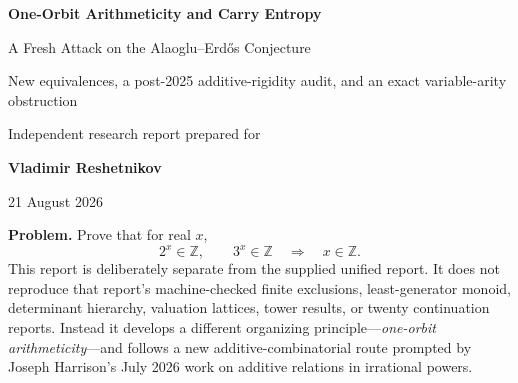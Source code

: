 \documentclass[11pt,oneside]{article}
\theoremstyle{definition}
\newcommand{\Z}{\mathbb{Z}}
\begin{document}
\hypersetup{pageanchor=false}
\begin{titlepage}
\centering
\vspace*{1.4cm}
{\Huge\bfseries\color{DeepBlue} One-Orbit Arithmeticity and Carry Entropy\par}
\vspace{0.35cm}
{\LARGE A Fresh Attack on the Alaoglu--Erd\H{o}s Conjecture\par}
\vspace{0.8cm}
{\large New equivalences, a post-2025 additive-rigidity audit, and an exact variable-arity obstruction\par}
\vfill
{\large Independent research report prepared for\par}
\vspace{0.15cm}
{\Large\bfseries Vladimir Reshetnikov\par}
\vspace{0.8cm}
{\large 21 August 2026\par}
\vfill
\begin{minipage}{0.88\textwidth}
\small
\textbf{Problem.} Prove that for real $x$,
\[
        2^x\in\Z,\qquad 3^x\in\Z
        \quad\Longrightarrow\quad x\in\Z.
\]
This report is deliberately separate from the supplied unified report.  It does not reproduce that report's machine-checked finite exclusions, least-generator monoid, determinant hierarchy, valuation lattices, tower results, or twenty continuation reports.  Instead it develops a different organizing principle---\emph{one-orbit arithmeticity}---and follows a new additive-combinatorial route prompted by Joseph Harrison's July 2026 work on additive relations in irrational powers.
\end{minipage}
\end{titlepage}
\hypersetup{pageanchor=true}
\end{document}

